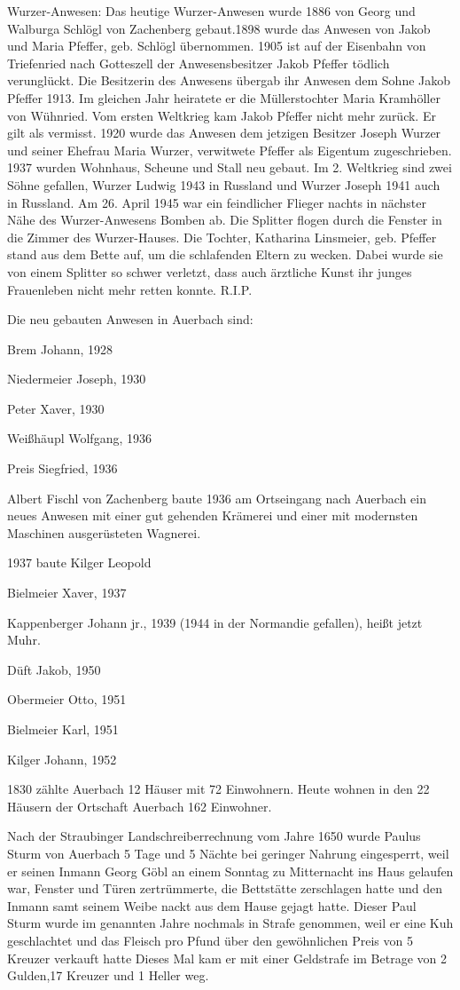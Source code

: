 \documentclass[12pt,a4pager]{book}
\begin{document}
Wurzer-Anwesen: Das heutige Wurzer-Anwesen wurde 1886 von Georg und Walburga
Schlögl von Zachenberg gebaut.1898 wurde das Anwesen von Jakob und Maria
Pfeffer, geb. Schlögl übernommen. 1905 ist auf der Eisenbahn von Triefenried
nach Gotteszell der Anwesensbesitzer Jakob Pfeffer tödlich verunglückt. Die
Besitzerin des Anwesens übergab ihr Anwesen dem Sohne Jakob Pfeffer 1913. Im
gleichen Jahr heiratete er die Müllerstochter Maria Kramhöller von Wühnried. Vom
ersten Weltkrieg kam Jakob Pfeffer nicht mehr zurück. Er gilt als vermisst. 1920
wurde das Anwesen dem jetzigen Besitzer Joseph Wurzer und seiner Ehefrau Maria
Wurzer, verwitwete Pfeffer als Eigentum zugeschrieben. 1937 wurden Wohnhaus,
Scheune und Stall neu gebaut. Im 2. Weltkrieg sind zwei Söhne gefallen, Wurzer
Ludwig 1943 in Russland und Wurzer Joseph 1941 auch in Russland. Am 26. April
1945 war ein feindlicher Flieger nachts in nächster Nähe des Wurzer-Anwesens
Bomben ab. Die Splitter flogen durch die Fenster in die Zimmer des
Wurzer-Hauses. Die Tochter, Katharina Linsmeier, geb. Pfeffer stand aus dem
Bette auf‚ um die schlafenden Eltern zu wecken. Dabei wurde sie von einem
Splitter so schwer verletzt, dass auch ärztliche Kunst ihr junges Frauenleben
nicht mehr retten konnte. R.I.P.

Die neu gebauten Anwesen in Auerbach sind:

Brem Johann, 1928

Niedermeier Joseph, 1930

Peter Xaver, 1930

Weißhäupl Wolfgang, 1936

Preis Siegfried, 1936

Albert Fischl von Zachenberg baute 1936 am Ortseingang nach Auerbach ein neues
Anwesen mit einer gut gehenden Krämerei und einer mit modernsten Maschinen
ausgerüsteten Wagnerei.

1937 baute Kilger Leopold

Bielmeier Xaver, 1937

Kappenberger Johann jr., 1939 (1944 in der Normandie gefallen), heißt jetzt
Muhr.

Düft Jakob, 1950

Obermeier Otto, 1951

Bielmeier Karl, 1951

Kilger Johann, 1952

1830 zählte Auerbach 12 Häuser mit 72 Einwohnern. Heute wohnen in den 22 Häusern
der Ortschaft Auerbach 162 Einwohner.

Nach der Straubinger Landschreiberrechnung vom Jahre 1650 wurde Paulus Sturm von
Auerbach 5 Tage und 5 Nächte bei geringer Nahrung eingesperrt, weil er seinen
Inmann Georg Göbl an einem Sonntag zu Mitternacht ins Haus gelaufen war, Fenster
und Türen zertrümmerte, die Bettstätte zerschlagen hatte und den Inmann samt
seinem Weibe nackt aus dem Hause gejagt hatte. Dieser Paul Sturm wurde im
genannten Jahre nochmals in Strafe genommen, weil er eine Kuh geschlachtet und
das Fleisch pro Pfund über den gewöhnlichen Preis von 5 Kreuzer verkauft hatte
Dieses Mal kam er mit einer Geldstrafe im Betrage von 2 Gulden,17 Kreuzer und 1
Heller weg.
\end{document}
